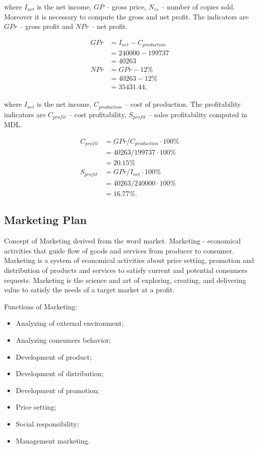 \noindent
where $I_{net}$ is the net income, $GP$ -- gross price, $N_{cs}$ -- number of copies sold. Moreover it is necessary to compute the gross and net profit. The indicators are $GPr$ -- gross profit and $NPr$ -- net profit.

\begin{equation}
 \begin{split}
  GPr &= I_{net} - C_{production}\\
              &= 240000 - 199737\\
              &= 40263\\
  NPr &= GPr - 12\% \\
             &= 40263 - 12\% \\
             &= 35431.44,
 \end{split}
\end{equation}

\noindent
where $I_{net}$ is the net income, $C_{production}$ -- cost of production. The profitability indicators are $C_{profit}$ -- cost profitability, $S_{profit}$ -- sales profitability computed in MDL.

\begin{equation}
 \begin{split}
  C_{profit} &= GPr / C_{production} \cdot 100\%\\
              &= 40263 / 199737 \cdot 100\% \\
              &= 20.15 \%\\
  S_{profit} &= GPr / I_{net} \cdot 100\% \\
             &= 40263 / 240000 \cdot 100\% \\
             &= 16.77 \%.
 \end{split}
\end{equation}

\subsection{Marketing Plan}
Concept of Marketing derived from the word market. Marketing - economical activities that guide flow of goods and services from producer to consumer. Marketing is a system of economical activities about price setting, promotion and distribution of products and services to satisfy current and potential consumers requests. Marketing is the science and art of exploring, creating, and delivering value to satisfy the needs of a target market at a profit.

 Functions of Marketing:
 \begin{itemize}
 \item Analyzing of external environment;
 \item Analyzing consumers behavior;
 \item Development of product;
 \item Development of distribution;
 \item Development of promotion;
 \item Price setting;
 \item Social responsibility;
 \item Management marketing.
\end{itemize}

